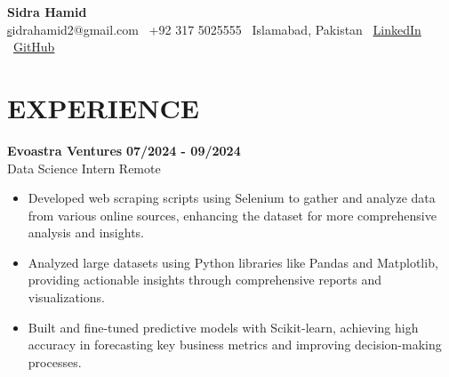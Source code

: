 \documentclass[a4paper,10pt]{article}
\begin{document}
\noindent %
{\Large \textbf{ Sidra Hamid }} \\
\small
\href{mailto:sidrahamid2@gmail.com}sidrahamid2@gmail.com \textbar \
+92 317 5025555 \textbar \
Islamabad, Pakistan \textbar \
\href{https://linkedin.com/sidra-hamid}{LinkedIn} \textbar \
\href{https://github.com/Sidra-Hamid}{GitHub}
\vspace{0.2em}

\section*{EXPERIENCE}

\textbf{ Evoastra Ventures } \hfill \textbf{ 07/2024 - 09/2024 } \\
Data Science Intern \hfill Remote\\[-0.3em]
\begin{itemize}[leftmargin=1em, noitemsep, topsep=0pt, partopsep=0pt, parsep=0pt]

    \item Developed web scraping scripts using Selenium to gather and analyze data from various online sources, enhancing the dataset for more comprehensive analysis and insights.

    \item Analyzed large datasets using Python libraries like Pandas and Matplotlib, providing actionable insights through comprehensive reports and visualizations.

    \item Built and fine-tuned predictive models with Scikit-learn, achieving high accuracy in forecasting key business metrics and improving decision-making processes.

\end{itemize}\vspace{0.3em} %
\end{document}
